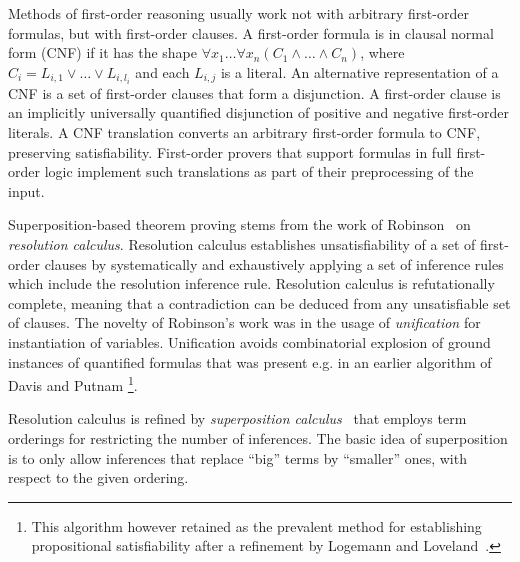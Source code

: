 {Methods of first-order reasoning usually work not with arbitrary first-order formulas, but with first-order clauses. A first-order formula is in clausal normal form (CNF) if it has the shape $\forall x_1\ldots\forall x_n(C_1\wedge\ldots\wedge C_n)$, where $C_i = L_{i,1}\vee\ldots\vee L_{i,l_i}$ and each $L_{i,j}$ is a literal. An alternative representation of a CNF is a set of first-order clauses that form a disjunction. A first-order clause is an implicitly universally quantified disjunction of positive and negative first-order literals. A CNF translation converts an arbitrary first-order formula to CNF, preserving satisfiability. First-order provers that support formulas in full first-order logic implement such translations as part of their preprocessing of the input.

Superposition-based theorem proving stems from the work of Robinson~\cite{Robinson65} on \emph{resolution calculus}. Resolution calculus establishes unsatisfiability of a set of first-order clauses by systematically and exhaustively applying a set of inference rules which include the resolution inference rule. Resolution calculus is refutationally complete, meaning that a contradiction can be deduced from any unsatisfiable set of clauses. The novelty of Robinson's work was in the usage of \emph{unification} for instantiation of variables. Unification avoids combinatorial explosion of ground instances of quantified formulas that was present e.g. in an earlier algorithm of Davis and Putnam \cite{davis1960computing}\footnote{This algorithm however retained as the prevalent method for establishing propositional satisfiability after a refinement by Logemann and Loveland~\cite{davis1962machine}.}.

Resolution calculus is refined by \emph{superposition calculus}~\cite{BG90, BG94} that employs term orderings for restricting the number of inferences. The basic idea of superposition is to only allow inferences that replace ``big'' terms by ``smaller'' ones, with respect to the given ordering.


}
